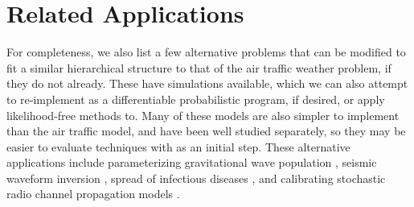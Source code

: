 \section{Related Applications}
\label{related-applications}

For completeness, we also list a few alternative problems that can be modified to fit a similar hierarchical structure to that of the air traffic weather problem, if they do not already. These have simulations available, which we can also attempt to re-implement as a differentiable probabilistic program, if desired, or apply likelihood-free methods to. Many of these models are also simpler to implement than the air traffic model, and have been well studied separately, so they may be easier to evaluate techniques with as an initial step. These alternative applications include parameterizing gravitational wave population \cite{ruhe2022normalizingflowshierarchicalbayesian}, seismic waveform inversion \cite{gouveia1998swi}, spread of infectious diseases \cite{trostle2022gaussianprocessapproximationspatialsir}, and calibrating stochastic radio channel propagation models \cite{bharti2022radio}.


